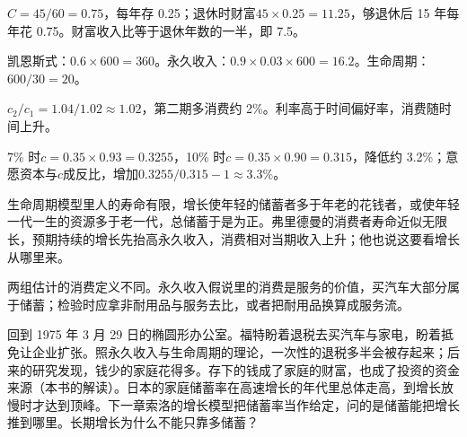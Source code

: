 \begin{answers}
\item $C=45/60=0.75$，每年存 0.25；退休时财富$45\times0.25=11.25$，够退休后 15 年每年花 0.75。财富收入比等于退休年数的一半，即 7.5。
\item 凯恩斯式：$0.6\times600=360$。永久收入：$0.9\times0.03\times600=16.2$。生命周期：$600/30=20$。
\item $c_2/c_1=1.04/1.02\approx1.02$，第二期多消费约 2\%。利率高于时间偏好率，消费随时间上升。
\item 7\% 时$c=0.35\times0.93=0.3255$，10\% 时$c=0.35\times0.90=0.315$，降低约 3.2\%；意愿资本与$c$成反比，增加$0.3255/0.315-1\approx3.3\%$。
\item 生命周期模型里人的寿命有限，增长使年轻的储蓄者多于年老的花钱者，或使年轻一代一生的资源多于老一代，总储蓄于是为正。弗里德曼的消费者寿命近似无限长，预期持续的增长先抬高永久收入，消费相对当期收入上升；他也说这要看增长从哪里来。
\item 两组估计的消费定义不同。永久收入假说里的消费是服务的价值，买汽车大部分属于储蓄；检验时应拿非耐用品与服务去比，或者把耐用品换算成服务流。
\end{answers}

回到 1975 年 3 月 29 日的椭圆形办公室。福特盼着退税去买汽车与家电，盼着抵免让企业扩张。照永久收入与生命周期的理论，一次性的退税多半会被存起来；后来的研究发现，钱少的家庭花得多。存下的钱成了家庭的财富，也成了投资的资金来源（本书的解读）。日本的家庭储蓄率在高速增长的年代里总体走高，到增长放慢时才达到顶峰。下一章索洛的增长模型把储蓄率当作给定，问的是储蓄能把增长推到哪里。长期增长为什么不能只靠多储蓄？
